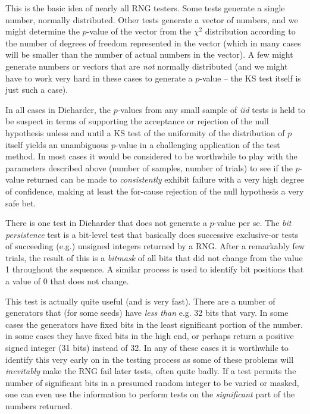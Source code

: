 \documentclass[12pt]{book}
\begin{document}
This is the basic idea of nearly all RNG testers.  Some tests generate a
single number, normally distributed.  Other tests generate a vector of
numbers, and we might determine the $p$-value of the vector from the
$\chi^2$ distribution according to the number of degrees of freedom
represented in the vector (which in many cases will be smaller than the
number of actual numbers in the vector).  A few might generate numbers
or vectors that are {\em not} normally distributed (and we might have to
work very hard in these cases to generate a $p$-value -- the KS test
itself is just such a case).

In all cases in Dieharder, the $p$-values from any small sample of {\em
iid} tests is held to be suspect in terms of supporting the acceptance
or rejection of the null hypothesis unless and until a KS test of the
uniformity of the distribution of $p$ itself yields an unambiguous
$p$-value in a challenging application of the test method.  In most
cases it would be considered to be worthwhile to play with the
parameters described above (number of samples, number of trials) to see
if the $p$-value returned can be made to {\em consistently} exhibit
failure with a very high degree of confidence, making at least the
for-cause rejection of the null hypothesis a very safe bet.

There is one test in Dieharder that does not generate a $p$-value per
se.  The {\em bit persistence} test is a bit-level test that basically
does successive exclusive-or tests of succeeding (e.g.) unsigned
integers returned by a RNG.  After a remarkably few trials, the result
of this is a {\em bitmask} of all bits that did not change from the
value 1 throughout the sequence.  A similar process is used to identify
bit positions that a value of 0 that does not change. 

This test is actually quite useful (and is very fast).  There are a
number of generators that (for some seeds) have {\em less than} e.g. 32
bits that vary.  In some cases the generators have fixed bits in the
least significant portion of the number. in some cases they have fixed
bits in the high end, or perhaps return a positive signed integer (31
bits) instead of 32.  In any of these cases it is worthwhile to identify
this very early on in the testing process as some of these problems will
{\em inevitably} make the RNG fail later tests, often quite badly.  If a
test permits the number of significant bits in a presumed random integer
to be varied or masked, one can even use the information to perform
tests on the {\em significant} part of the numbers returned.
\end{document}
